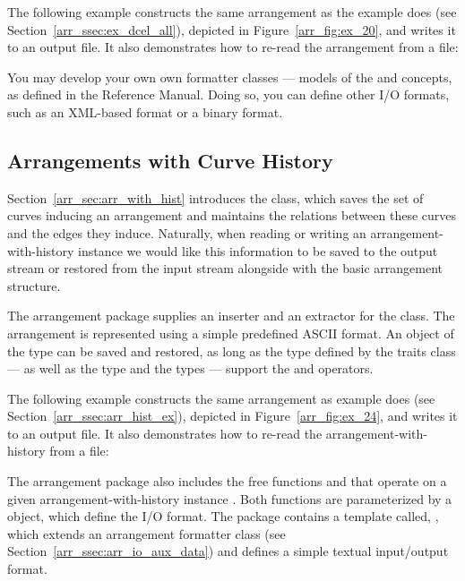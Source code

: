 \begin{ccAdvanced}
The following example constructs the same arrangement as the
example  does
(see Section~\ref{arr_ssec:ex_dcel_all}), depicted in
Figure~\ref{arr_fig:ex_20}, and writes it to an output file. It also
demonstrates how to re-read the arrangement from a file:


You may develop your own own formatter classes --- models of the
 and 
concepts, as defined in the Reference Manual.
Doing so, you can define other I/O formats, such as an XML-based
format or a binary format.
\end{ccAdvanced}

\subsection{Arrangements with Curve History\label{arr_ssec:arr_io_hist}}

Section~\ref{arr_sec:arr_with_hist} introduces the
 class, which saves the
set of curves inducing an arrangement and maintains the relations between
these curves and the edges they induce. Naturally, when reading or writing 
an arrangement-with-history instance we would like this information to be
saved to the output stream or restored from the input stream alongside
with the basic arrangement structure.

The arrangement package supplies an inserter and an extractor for the
 class. The arrangement is
represented using a simple predefined ASCII format. An object of the
 type can be saved and 
restored, as long as the  type defined by the traits 
class --- as well as the  type and the  
types --- support the \ccc{<<} and\ccc{>>} operators.

The following example constructs the same arrangement as example
 does
(see Section~\ref{arr_ssec:arr_hist_ex}), depicted in 
Figure~\ref{arr_fig:ex_24}, and writes it to an output file. It also
demonstrates how to re-read the arrangement-with-history from a file:


\begin{ccAdvanced}
The arrangement package also includes the free functions
 and  that
operate on a given arrangement-with-history instance .
Both functions are parameterized by a  object, which define
the I/O format. The package contains a template called,
, which extends
an arrangement formatter class (see Section~\ref{arr_ssec:arr_io_aux_data})
and defines a simple textual input/output format.
\end{ccAdvanced}

